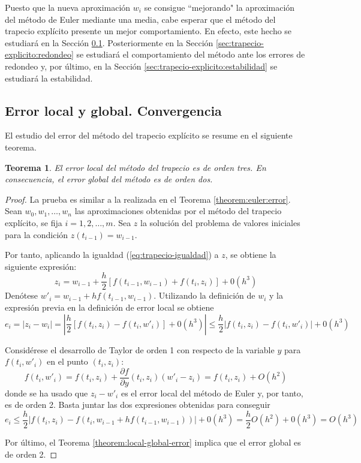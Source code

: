 \documentclass{article}
\theoremstyle{theorem-style}  %
\newtheorem{theorem}{Teorema}[section]  %
\theoremstyle{definition-style}
\theoremstyle{example-style}
\begin{document}
		Puesto que la nueva aproximación $w_i$ se consigue ``mejorando" la aproximación del método de Euler mediante una media, cabe esperar que el método del trapecio explícito presente un mejor comportamiento. En efecto, este hecho se estudiará en la Sección \ref{sec:trapecio-explicito:error}. Posteriormente en la Sección \ref{sec:trapecio-explicito:redondeo} se estudiará el comportamiento del método ante los errores de redondeo y, por último, en la Sección \ref{sec:trapecio-explicito:estabilidad} se estudiará la estabilidad.

	\subsection{Error local y global. Convergencia} \label{sec:trapecio-explicito:error}

		El estudio del error del método del trapecio explícito se resume en el siguiente teorema.

		\begin{theorem}
			El error local del método del trapecio es de orden tres. En consecuencia, el error global del método es de orden dos.
		\end{theorem}

		\begin{proof}
			La prueba es similar a la realizada en el Teorema \ref{theorem:euler:error}. Sean $w_0, w_1, \ldots, w_n$ las aproximaciones obtenidas por el método del trapecio explícito, se fija $i = 1, 2, \ldots, m$. Sea $z$ la solución del problema de valores iniciales para la condición $z(t_{i-1}) = w_{i-1}$. 

			Por tanto, aplicando la igualdad (\ref{eq:trapecio-igualdad}) a $z$, se obtiene la siguiente expresión:
			$$ z_i = w_{i-1} + \frac{h}{2} \left[f(t_{i-1},w_{i-1}) + f(t_i, z_i)\right] + 0(h^3) $$
			Denótese $w'_i =  w_{i-1} + hf(t_{i-1}, w_{i-1})$. Utilizando la definición de $w_i$ y la expresión previa en la definición de error local se obtiene
			$$ e_i = \left|z_i - w_i\right| =  \left|\frac{h}{2} \left[f(t_i, z_i) - f(t_i, w'_i)\right] + 0(h^3) \right| \le \frac{h}{2} \left|f(t_i, z_i) - f(t_i, w'_i)\right| + 0(h^3) $$

			Considérese el desarrollo de Taylor de orden 1 con respecto de la variable $y$ para $f(t_i, w'_i)$ en el punto $(t_i,z_i)$:
			$$ f(t_i, w'_i) = f(t_i, z_i) + \frac{\partial f}{\partial y}(t_i, z_i) (w'_i - z_i) = f(t_i, z_i) + O(h^2) $$
			donde se ha usado que $z_i - w'_i$ es el error local del método de Euler y, por tanto, es de orden 2. Basta juntar las dos expresiones obtenidas para conseguir
			$$ e_i \le \frac{h}{2} \left|f(t_i, z_i) - f(t_i, w_{i-1} + hf(t_{i-1}, w_{i-1}))\right| + 0(h^3) =  \frac{h}{2} O(h^2) + 0(h^3) = O(h^3) $$

			Por último, el Teorema \ref{theorem:local-global-error} implica que el error global es de orden 2.

		\end{proof}
\end{document}
